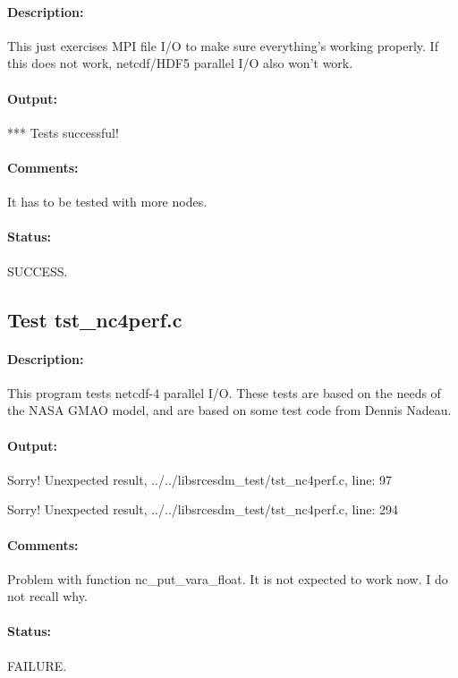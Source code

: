 \paragraph{Description:} This just exercises MPI file I/O to make sure everything's working properly.
If this does not work, netcdf/HDF5 parallel I/O also won't work.

\paragraph{Output:} *** Tests successful!

\paragraph{Comments:} It has to be tested with more nodes.

\paragraph{Status:} SUCCESS.

\subsection{Test tst\_nc4perf.c}

\paragraph{Description:} This program tests netcdf-4 parallel I/O.
These tests are based on the needs of the NASA GMAO model, and are based on some test code from Dennis Nadeau.

\paragraph{Output:} Sorry! Unexpected result, ../../libsrcesdm\_test/tst\_nc4perf.c, line: 97

Sorry! Unexpected result, ../../libsrcesdm\_test/tst\_nc4perf.c, line: 294

\paragraph{Comments:} Problem with function nc\_put\_vara\_float. It is not expected to work now. I do not recall why.

\paragraph{Status:} FAILURE.

